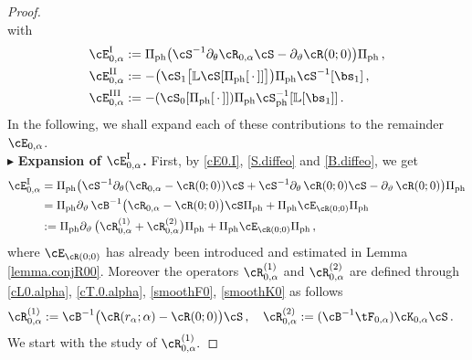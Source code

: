\documentclass[a4paper,reqno,10pt]{article}
\newcommand{\pa}{\partial}
\newcommand{\LL}{\mathbb{L}}
\begin{document}
\begin{proof}
\begin{equation}
\end{equation}
with
\begin{align}
	\cE_{0,\alpha}^{\rm I} & := \Pi_{\rm ph} \big( \cS^{-1} \pa_{\theta} \cR_{0,\alpha} \cS - \pa_{\vartheta} \cR(0;0) \big) \Pi_{\rm ph}\,, \label{cE0.I} \\
	\cE_{0,\alpha}^{\rm II} & := - \big( \cS_{1}\big[\LL \cS[\Pi_{\rm ph}[\,\cdot\,]]\big] \big)\Pi_{\rm ph} \cS^{-1}[\bs_{1}] \,, \label{cE0.II} \\
	\cE_{0,\alpha}^{\rm III} & := - (\cS_{0}[\Pi_{\rm ph}[\,\cdot\,]])\Pi_{\rm ph}\cS_{\rm ph}^{-1} [\LL[\bs_{1}]]  \label{cE0.III} \,.
\end{align}
In the following, we shall expand each of these contributions to the remainder $\cE_{0,\alpha}$.
\\[1mm]
\noindent  $\blacktriangleright$ {\bf Expansion of $\cE_{0,\alpha}^{\rm I}$.} 
First, by \eqref{cE0.I}, \eqref{S.diffeo} and  \eqref{B.diffeo}, we get%
	\begin{align}
		\cE_{0,\alpha}^{\rm I}  
		& = \Pi_{\rm ph} \big( \cS^{-1} \pa_{\theta}(\cR_{0,\alpha}-\cR(0;0))\cS + \cS^{-1}\pa_{\theta}\,\cR(0;0) \cS -  \pa_{\vartheta} \,\cR(0;0)  \big) \Pi_{\rm ph} \\
		& = \Pi_{\rm ph}  \pa_{\vartheta} \, \cB^{-1}\big(\cR_{0,\alpha}-\cR(0;0)\big)\cS  \Pi_{\rm ph} + \Pi_{\rm ph} \cE_{\cR(0;0)} \Pi_{\rm ph} \\
		&  := \Pi_{\rm ph} \pa_{\vartheta}\, \big( \cR_{0,\alpha}^{(1)} + \cR_{0,\alpha}^{(2)}  \big)\Pi_{\rm ph} + \Pi_{\rm ph} \cE_{\cR(0;0)} \Pi_{\rm ph}  \,, \label{leone1}  
	\end{align}
	where $\cE_{\cR(0;0)}$ has already been introduced and estimated  in Lemma \ref{lemma.conjR00}. Moreover the operators $\cR_{0,\alpha}^{(1)}$ and $ \cR_{0,\alpha}^{(2)} $ are defined through   \eqref{cL0.alpha}, \eqref{cT.0.alpha}, \eqref{smoothF0}, \eqref{smoothK0} as follows
	\begin{equation}\label{leone5}
		\begin{aligned}
			\cR_{0,\alpha}^{(1)} & :=  \cB^{-1} \big(\cR(r_\alpha;\alpha) -\cR(0;0) \big)\cS \,, \quad 	\cR_{0,\alpha}^{(2)}  := (\cB^{-1} \tF_{0,\alpha})  \cK_{0,\alpha} \cS \,.
		\end{aligned}
	\end{equation}	
	We start with the study of $\cR_{0,\alpha}^{(1)}.$

\end{proof}
\end{document}
